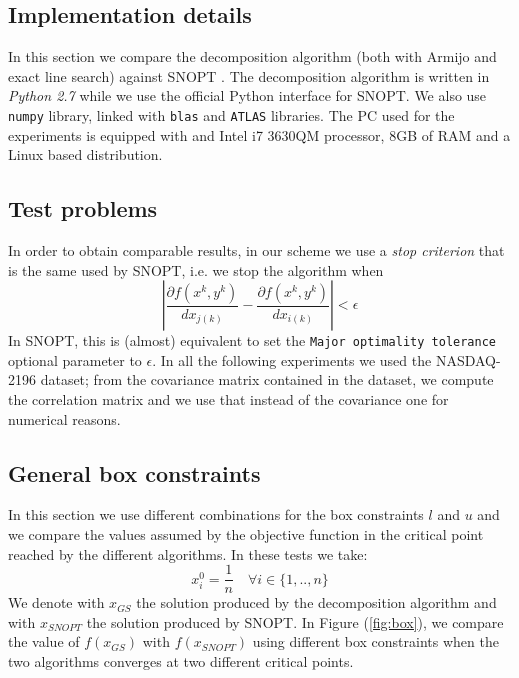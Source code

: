 
\subsection{Implementation details}
In this section we compare the decomposition algorithm (both with Armijo and exact line search) against SNOPT \cite{snopt}.
The decomposition algorithm is written in \textit{Python 2.7} while we use the official Python interface for SNOPT. We also use \texttt{numpy} library, linked with \texttt{blas} and \texttt{ATLAS} libraries. The PC used for the experiments is equipped with and Intel i7 3630QM processor, 8GB of RAM and a Linux based distribution.\\

\subsection{Test problems}
In order to obtain comparable results, in our scheme we use a \textit{stop criterion} that is the same used by SNOPT, i.e. we stop the algorithm when
\begin{equation}\label{eq:stop}
\left| \frac{\partial f(x^k,y^k)}{d{x_{j(k)}}} - \frac{\partial f(x^k,y^k)}{d{x_{i(k)}} }\right| < \epsilon
\end{equation}
In SNOPT, this is (almost) equivalent to set the \texttt{Major optimality tolerance} optional parameter to $\epsilon$. 
In all the following experiments we used the NASDAQ-2196 dataset\footnotemark[1]; from the covariance matrix contained in the dataset, we compute the correlation matrix and we use that instead of the covariance one for numerical reasons. 

\subsection{General box constraints}
In this section we use different combinations for the box constraints $l$ and $u$ and we compare the values assumed by the objective function in the critical point reached by the different algorithms. In these tests we take:
\begin{equation}
x_i^0 = \frac{1}{n} \quad \forall i \in \{1, .., n \}
\end{equation}
We denote with $x_{GS}$ the solution produced by the decomposition algorithm and with $x_{SNOPT}$ the solution produced by SNOPT. In Figure (\ref{fig:box}), we compare the value of $f(x_{GS})$ with $f(x_{SNOPT})$ using different box constraints when the two algorithms converges at two different critical points.

